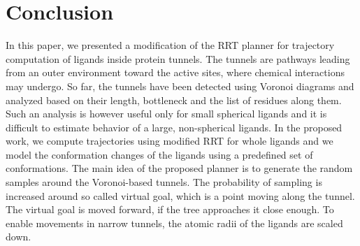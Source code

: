 \documentclass[usletter, 10pt, conference]{ieeeconf} %
\def\dt{d_{tunnel}}
\def\RI{R_{init}}
\def\rv{R_{tunnel}}
\begin{document}



\section{Conclusion}

In this paper, we presented a modification of the RRT planner for trajectory computation of ligands inside protein tunnels.
The tunnels are pathways leading from an outer environment toward the active sites, where chemical interactions may undergo.
So far, the tunnels have been detected using Voronoi diagrams and analyzed based on their length, bottleneck and the list of residues along them.
Such an analysis is however useful only for small spherical ligands and it is difficult to estimate behavior of a large, non-spherical ligands.
In the proposed work, we compute trajectories using modified RRT for whole ligands and we model the conformation changes of the
ligands using a predefined set of conformations.
The main idea of the proposed planner is to generate the random samples around the Voronoi-based tunnels.
The probability of sampling is increased around so called virtual goal, which is a point moving along the tunnel. 
The virtual goal is moved forward, if the tree approaches it close enough.
To enable movements in narrow tunnels, the atomic radii of the ligands are scaled down.




\end{document}
